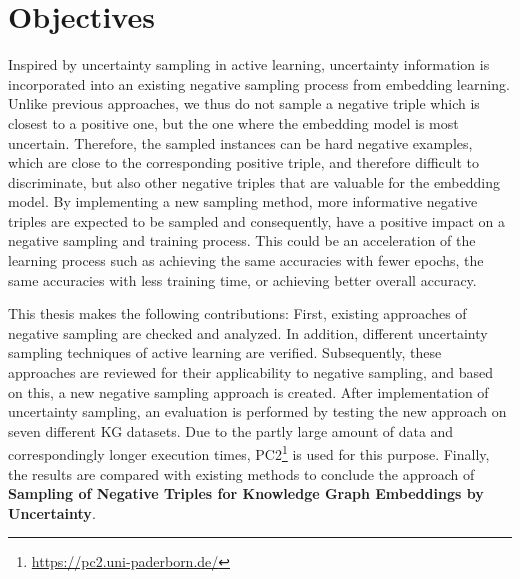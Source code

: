 \section{Objectives}
\label{sec:objectives}

Inspired by uncertainty sampling in active learning, uncertainty information is incorporated into an existing negative sampling process from embedding learning.
Unlike previous approaches, we thus do not sample a negative triple which is closest to a positive one, but the one where the embedding model is most uncertain.
Therefore, the sampled instances can be hard negative examples, which are close to the corresponding positive triple, and therefore difficult to discriminate, but also other negative triples that are valuable for the embedding model.
By implementing a new sampling method, more informative negative triples are expected to be sampled and consequently, have a positive impact on a negative sampling and training process.
This could be an acceleration of the learning process such as achieving the same accuracies with fewer epochs, the same accuracies with less training time, or achieving better overall accuracy.

This thesis makes the following contributions:
First, existing approaches of negative sampling are checked and analyzed.
In addition, different uncertainty sampling techniques of active learning are verified.
Subsequently, these approaches are reviewed for their applicability to negative sampling, and based on this, a new negative sampling approach is created.
After implementation of uncertainty sampling, an evaluation is performed by testing the new approach on seven different \ac{KG} datasets.
Due to the partly large amount of data and correspondingly longer execution times, \ac{PC2}\footnote{\url{https://pc2.uni-paderborn.de/}} is used for this purpose.
Finally, the results are compared with existing methods to conclude the approach of \textbf{Sampling of Negative Triples for Knowledge Graph Embeddings by Uncertainty}.








